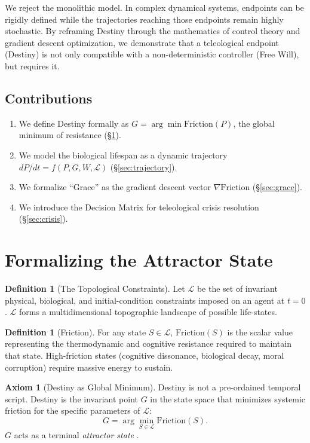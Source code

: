 \documentclass[12pt, a4paper]{article}
\theoremstyle{plain}
\theoremstyle{definition}
\newtheorem{definition}[theorem]{Definition}
\newtheorem{axiom}[theorem]{Axiom}
\theoremstyle{remark}
\newcommand{\calL}{\mathcal{L}}
\begin{document}
We reject the monolithic model. In complex dynamical systems, endpoints can be rigidly defined while the trajectories reaching those endpoints remain highly stochastic. By reframing Destiny through the mathematics of control theory and gradient descent optimization, we demonstrate that a teleological endpoint (Destiny) is not only compatible with a non-deterministic controller (Free Will), but requires it.

\subsection{Contributions}
\begin{enumerate}
    \item We define Destiny formally as $G = \arg\min \text{Friction}(P)$, the global minimum of resistance (\S\ref{sec:def}).
    \item We model the biological lifespan as a dynamic trajectory $dP/dt = f(P, G, W, \calL)$ (\S\ref{sec:trajectory}).
    \item We formalize ``Grace'' as the gradient descent vector $\nabla \text{Friction}$ (\S\ref{sec:grace}).
    \item We introduce the Decision Matrix for teleological crisis resolution (\S\ref{sec:crisis}).
\end{enumerate}

\section{Formalizing the Attractor State}\label{sec:def}

\begin{definition}[The Topological Constraints]
Let $\calL$ be the set of invariant physical, biological, and initial-condition constraints imposed on an agent at $t=0$. $\calL$ forms a multidimensional topographic landscape of possible life-states.
\end{definition}

\begin{definition}[Friction]
For any state $S \in \calL$, $\text{Friction}(S)$ is the scalar value representing the thermodynamic and cognitive resistance required to maintain that state. High-friction states (cognitive dissonance, biological decay, moral corruption) require massive energy to sustain.
\end{definition}

\begin{axiom}[Destiny as Global Minimum]
Destiny is not a pre-ordained temporal script. Destiny is the invariant point $G$ in the state space that minimizes systemic friction for the specific parameters of $\calL$:
\begin{equation}
    G = \arg\min_{S \in \calL} \text{Friction}(S).
\end{equation}
$G$ acts as a terminal \emph{attractor state} \citep{Lorenz1963}.
\end{axiom}
\end{document}
